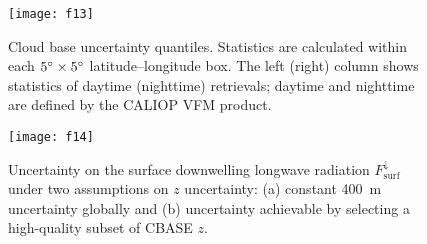 \documentclass[essd,manuscript]{copernicus}
\begin{document}
\begin{figure*}
{\centering \texttt{[image: f13]}

}
  \caption{Cloud base uncertainty quantiles.  Statistics are calculated within
    each $5^{\circ}\times 5^{\circ}$ latitude--longitude box.  The left (right)
    column shows statistics of daytime (nighttime) retrievals; daytime and
    nighttime are defined by the CALIOP VFM product.}
  \label{fig:uncert-quantiles}
\end{figure*}

\begin{figure}
  {\centering \texttt{[image: f14]}
    
  }
  \caption{Uncertainty on the surface downwelling longwave radiation \ensuremath{F_\text{surf}^\downarrow}{}
    under two assumptions on \ensuremath{z}{} uncertainty: (a) constant 400~\unit{m}
    uncertainty globally and (b) uncertainty achievable by selecting a 
    high-quality subset of CBASE \ensuremath{z}.}
  \label{fig:dlr}
\end{figure}

\end{document}
